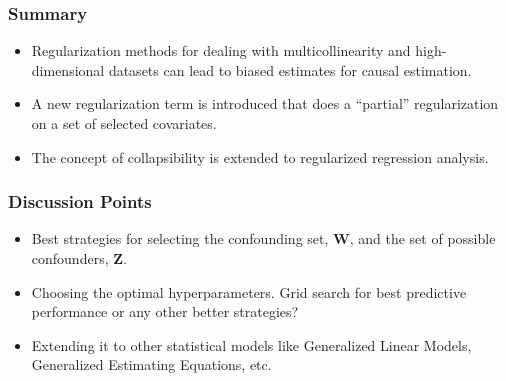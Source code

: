 \documentclass{beamer}
\begin{document}
\begin{frame}
	\frametitle{Summary}
	\begin{itemize}
		\item Regularization methods for dealing with multicollinearity
			and high-dimensional datasets can lead to biased
			estimates for causal estimation.
		\item A new regularization term is introduced that does a
			``partial'' regularization on a set of selected
			covariates.
		\item The concept of collapsibility is extended to regularized
			regression analysis.
	\end{itemize}

\end{frame}

\begin{frame}
	\frametitle{Discussion Points}
	\begin{itemize}
		\item Best strategies for selecting the confounding set, $
			\bm{W} $, and the set of possible confounders, $ \bm{Z}
			$.
		\item Choosing the optimal hyperparameters. Grid search for best 
			predictive performance or any other better strategies?
		\item Extending it to other statistical models like Generalized
			Linear Models, Generalized Estimating Equations, etc.
	\end{itemize}
\end{frame}
\end{document}
